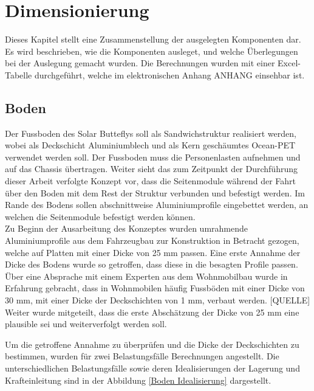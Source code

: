\section{Dimensionierung}
Dieses Kapitel stellt eine Zusammenstellung der ausgelegten Komponenten dar. Es wird beschrieben, wie die Komponenten ausleget, und welche Überlegungen bei der Auslegung gemacht wurden. Die Berechnungen wurden mit einer Excel-Tabelle durchgeführt, welche im elektronischen Anhang ANHANG einsehbar ist.

\subsection{Boden}
Der Fussboden des Solar Butteflys soll als Sandwichstruktur realisiert werden, wobei als Deckschicht Aluminiumblech und als Kern geschäumtes Ocean-PET verwendet werden soll. Der Fussboden muss die Personenlasten aufnehmen und auf das Chassis übertragen. Weiter sieht das zum Zeitpunkt der Durchführung dieser Arbeit verfolgte Konzept vor, dass die Seitenmodule während der Fahrt über den Boden mit dem Rest der Struktur verbunden und befestigt werden. Im Rande des Bodens sollen abschnittweise Aluminiumprofile eingebettet werden, an welchen die Seitenmodule befestigt werden können.\\
Zu Beginn der Ausarbeitung des Konzeptes wurden umrahmende Aluminiumprofile aus dem Fahrzeugbau zur Konstruktion in Betracht gezogen, welche auf Platten mit einer Dicke von 25 mm passen. Eine erste Annahme der Dicke des Bodens wurde so getroffen, dass diese in die besagten Profile passen. Über eine Absprache mit einem Experten aus dem Wohnmobilbau wurde in Erfahrung gebracht, dass in Wohnmobilen häufig Fussböden mit einer Dicke von 30 mm, mit einer Dicke der Deckschichten von 1 mm, verbaut werden. [QUELLE] Weiter wurde mitgeteilt, dass die erste Abschätzung der Dicke von 25 mm eine plausible sei und weiterverfolgt werden soll.

Um die getroffene Annahme zu überprüfen und die Dicke der Deckschichten zu bestimmen, wurden für zwei Belastungsfälle Berechnungen angestellt. Die unterschiedlichen Belastungsfälle sowie deren Idealisierungen der Lagerung und Krafteinleitung sind in der Abbildung \ref{Boden Idealisierung} dargestellt.

